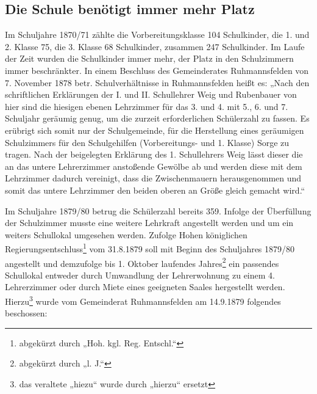 \documentclass[12pt,a4paper]{book}
\begin{document}
\subsection[Die Schule benötigt immer mehr Platz]{Die Schule benötigt
immer mehr Platz\protect\footnotemark{}\protect{}}

Im Schuljahre 1870/71 zählte die Vorbereitungsklasse 104 Schulkinder,
die 1. und 2. Klasse 75, die 3. Klasse 68 Schulkinder, zusammen 247
Schulkinder. Im Laufe der Zeit wurden die Schulkinder immer mehr, der
Platz in den Schulzimmern immer beschränkter. In einem Beschluss des
Gemeinderates Ruhmannsfelden von 7. November 1878 betr.
Schulverhältnisse in Ruhmannsfelden heißt es: „Nach den schriftlichen
Erklärungen der I. und II. Schullehrer Weig und Rubenbauer von hier sind
die hiesigen ebenen Lehrzimmer für das 3. und 4. mit 5., 6. und 7.
Schuljahr geräumig genug, um die zurzeit erforderlichen Schülerzahl zu
fassen. Es erübrigt sich somit nur der Schulgemeinde, für die
Herstellung eines geräumigen Schulzimmers für den Schulgehilfen
(Vorbereitungs- und 1. Klasse) Sorge zu tragen. Nach der beigelegten
Erklärung des 1. Schullehrers Weig lässt dieser die an das untere
Lehrerzimmer anstoßende Gewölbe ab und werden diese mit dem Lehrzimmer
dadurch vereinigt, dass die Zwischenmauern herausgenommen und somit das
untere Lehrzimmer den beiden oberen an Größe gleich gemacht wird.“

Im Schuljahre 1879/80 betrug die Schülerzahl bereits 359. Infolge der
Überfüllung der Schulzimmer musste eine weitere Lehrkraft angestellt
werden und um ein weiters Schullokal umgesehen werden. Zufolge Hohen
königlichen Regierungsentschluss\footnote{abgekürzt durch „Hoh. kgl.
Reg. Entschl.“} vom 31.8.1879 soll mit Beginn des Schuljahres 1879/80
angestellt und demzufolge bis 1. Oktober laufendes
Jahres\footnote{abgekürzt durch „l. J.“} ein passendes Schullokal
entweder durch Umwandlung der Lehrerwohnung zu einem 4. Lehrerzimmer
oder durch Miete eines geeigneten Saales hergestellt werden.
Hierzu\footnote{das veraltete „hiezu“ wurde durch „hierzu“ ersetzt}
wurde vom Gemeinderat Ruhmannsfelden am 14.9.1879 folgendes beschossen:
\end{document}
